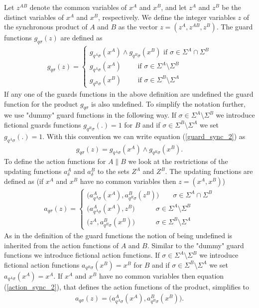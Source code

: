 \documentclass{article}
\begin{document}
 Let $z^{AB}$ denote the common variables of $x^{A}$ and $x^{B}$, and let $z^A$
and $z^B$ be the distinct variables of $x^{A}$ and $x^{B}$,
respectively. We define the integer variables $z$ of the
synchronous product of $A$ and $B$ as the vector $z=(z^A, z^{AB},
z^B)$. The guard functions $g_{q \sigma}(z)$ are defined as
\begin{eqnarray}\label{guard_sync_2}
g_{q \sigma}(z)=\left\{
\begin{array}{ll}
g_{q^A\sigma}(x^{A})\wedge g_{q^B\sigma}(x^{B}) \textrm{ if }\sigma\in \Sigma^A \cap \Sigma^B\\
g_{q^A\sigma}(x^{A}) \quad\quad \textrm{ if } \sigma\in \Sigma^A \setminus \Sigma^B\\
g_{q^B\sigma}(x^{B}) \quad\quad \textrm{ if }
\sigma\in\Sigma^B\setminus \Sigma^A
\end{array}\right.
\end{eqnarray}
If any one of the guards functions in the above definition are
undefined the guard function for the product $g_{q \sigma}$ is
also undefined. To simplify the notation further, we use "dummy"
guard functions in the following way. If $\sigma\in \Sigma^A
\setminus \Sigma^B$ we introduce fictional guards functions
$g_{q^B\sigma}(.)=1$ for $B$ and if $\sigma\in\Sigma^B\setminus
\Sigma^A$ we set $g_{q^A\sigma}(.)=1$. With this convention we can
write equation (\ref{guard_sync_2}) as
\begin{eqnarray}
g_{q \sigma}(z)= g_{q^A\sigma}(x^{A})\wedge g_{q^B\sigma}(x^{B}).
\end{eqnarray}
To define the action functions for $A\|B$ we look at the
restrictions of the updating functions $a^A_\delta$ and
$a^B_\delta$ to the sets $Z^A$ and $Z^B$. The updating functions
are defined as (if $x^{A}$ and $x^{B}$ have no common variables
then $z=(x^{A},x^{B})$)
\begin{eqnarray}\label{action_sync_2}
a_{q \sigma}(z)=\left\{
\begin{array}{ll}
 \big(a^A_{q^A \sigma}(x^{A}), a^B_{q^B \sigma}(z^{B})\big)\quad\quad\sigma\in \Sigma^A \cap \Sigma^B\\
\big(a^A_{q^A \sigma}(x^{A}), z^{B}\big)\quad\quad\quad\sigma\in \Sigma^A \setminus \Sigma^B\\
\big(z^{A}, a^B_{q^B \sigma}(x^{B})\big)\quad\quad\quad\sigma\in
\Sigma^B \setminus \Sigma^A
\end{array}\right.
\end{eqnarray}
As in the definition of the guard functions the notion of being
undefined is inherited from the action functions of $A$ and $B$.
Similar to the "dummy" guard functions we introduce fictional
action functions. If $\sigma\in \Sigma^A \setminus \Sigma^B$ we
introduce fictional action functions $a_{q^B\sigma}(x^B)=x^B$ for
$B$ and if $\sigma\in\Sigma^B\setminus \Sigma^A$ we set
$a_{q^A\sigma}(x^A)=x^A$. If $x^{A}$ and $x^{B}$ have no common
variables then equation (\ref{action_sync_2}), that defines the
action functions of the product, simplifies to
\begin{eqnarray}
a_{q \sigma}(z)=
 \big(a^A_{q^A \sigma}(x^{A}), a^B_{q^B \sigma}(x^{B})\big).
\end{eqnarray}
\end{document}
